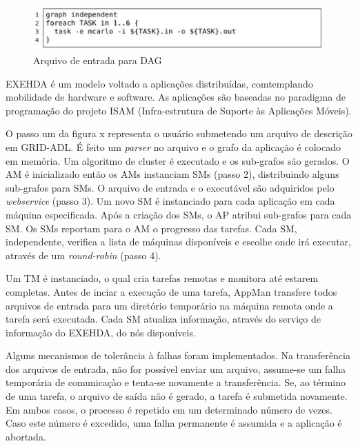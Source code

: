 \begin{figure}[htb]
\begin{center}
\includegraphics[scale=0.7]{./img/grid-adl.eps}
\caption{Arquivo de entrada para DAG}
\label{fig:Arquivo_DAG}
\end{center}
\end{figure}

EXEHDA é um modelo voltado a aplicações distribuídas, comtemplando mobilidade de hardware e software. As aplicações são baseadas no paradigma de programação do projeto ISAM (Infra-estrutura de Suporte às Aplicações Móveis).

O passo um da figura x representa o usuário submetendo um arquivo de descrição em GRID-ADL. É feito um \emph{parser} no arquivo e o grafo da aplicação é colocado em memória. Um algoritmo de cluster é executado e os sub-grafos são gerados. O AM é inicializado então os AMs instanciam SMs (passo 2), distribuindo alguns sub-grafos para SMs. O arquivo de entrada e o executável são adquiridos pelo \emph{webservice} (passo 3). Um novo SM é instanciado para cada aplicação em cada máquina especificada. Após a criação dos SMs, o AP atribui sub-grafos para cada SM. Os SMs reportam para o AM o progresso das tarefas. Cada SM, independente, verifica a lista de máquinas disponíveis e escolhe onde irá executar, através de um \emph{round-robin} (passo 4).

Um TM é instanciado, o qual cria tarefas remotas e monitora até estarem completas. Antes de inciar a execução de uma tarefa, AppMan transfere todos arquivos de entrada para um diretório temporário na máquina remota onde a tarefa será executada. Cada SM atualiza informação, através do serviço de informação do EXEHDA, do nós disponíveis. 

Alguns mecanismos de tolerância à falhas foram implementados. Na transferência dos arquivos de entrada, não for possível enviar um arquivo, assume-se um falha temporária de comunicaçào e tenta-se novamente a transferência. Se, ao término de uma tarefa, o arquivo de saída não é gerado, a tarefa é submetida novamente. Em ambos casos, o processo é repetido em um determinado número de vezes. Caso este número é excedido, uma falha permanente é assumida e a aplicação é abortada.


